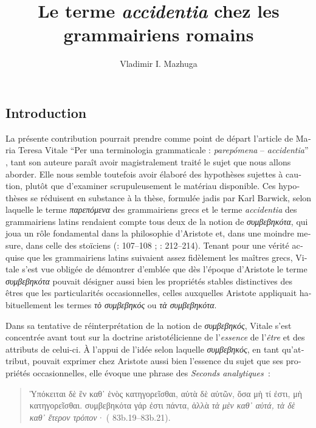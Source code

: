 \documentclass[output=paper]{langsci/langscibook}
\title{Le terme \textit{accidentia} chez les grammairiens romains}
\author{Vladimir I. Mazhuga\affiliation{Saint Petersburg Institute of History, RAS}}
\begin{document}
\begin{otherlanguage}{french}
\maketitle

\section{Introduction} 
La présente contribution pourrait prendre comme point de départ l’article de Maria Teresa Vitale “Per una terminologia grammaticale : \textit{parepómena} – \textit{accidentia}” \citep{vitale_per_1982}, tant son auteure paraît avoir magistralement traité le sujet que nous allons aborder. Elle nous semble toutefois avoir élaboré des hypothèses sujettes à caution, plutôt que d’examiner scrupuleusement le matériau disponible. Ces hypothèses se réduisent en substance à la thèse, formulée jadis par Karl Barwick, selon laquelle le terme \textit{παρεπόμενα} des grammairiens grecs et le terme \textit{accidentia} des grammairiens latins rendaient compte tous deux de la notion de \textit{συμβεβηκότα}, qui joua un rôle fondamental dans la philosophie d’Aristote et, dans une moindre mesure, dans celle des stoïciens (\citealt{barwick_remmius_1922}: 107--108 ; \citealt{vitale_per_1982}: 212–214). Tenant pour une vérité acquise que les grammairiens latins suivaient assez fidèlement les maîtres grecs, Vitale s’est vue obligée de démontrer d’emblée que dès l’époque d’Aristote le terme \textit{συμβεβηκότα} pouvait désigner aussi bien les propriétés stables distinctives des êtres que les particularités occasionnelles, celles auxquelles Aristote appliquait habituellement les termes \textit{τὸ συμβεβηκός} ou \textit{τὰ συμβεβηκότα}. 

Dans sa tentative de réinterprétation de la notion de \textit{συμβεβηκός}, Vitale s’est concentrée avant tout sur la doctrine aristotélicienne de l’\textit{essence} de l’\textit{être} et des attributs de celui-ci. À l’appui de l’idée selon laquelle \textit{συμβεβηκός}, en tant qu’attribut, pouvait exprimer chez Aristote aussi bien l’essence du sujet que ses propriétés occasionnelles, elle évoque une phrase des \textit{Seconds analytiques~}:

\begin{quote}
    Ὑπόκειται δὲ ἓν καθ᾿ ἑνὸς κατηγορεῖσθαι, αὐτὰ δὲ αὐτῶν, ὅσα μὴ τί ἐστι, μὴ κατηγορεῖσθαι. συμβεβηκότα γάρ ἐστι πάντα, ἀλλὰ \textit{τὰ μὲν καθ᾿ αὑτά, τὰ δὲ καθ᾿ ἕτερον τρόπον·} ( 83b.19–83b.21).


\end{quote}
\end{otherlanguage}
\end{document}
